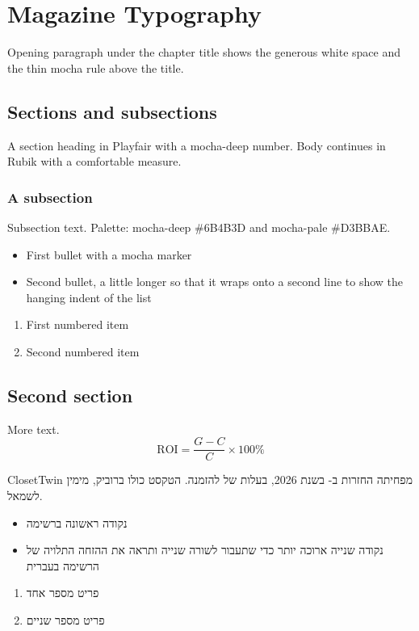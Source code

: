 \documentclass{closettwin}
\begin{document}
\mainmatter
\chapter{Magazine Typography}
Opening paragraph under the chapter title shows the generous white space and the thin mocha rule above the title.
\section{Sections and subsections}
A section heading in Playfair with a mocha-deep number. Body continues in Rubik with a comfortable measure.
\subsection{A subsection}
Subsection text. Palette: \textcolor{mochadeep}{mocha-deep \#6B4B3D} and \textcolor{mochapale}{mocha-pale \#D3BBAE}.
\begin{itemize}
\item First bullet with a mocha marker
\item Second bullet, a little longer so that it wraps onto a second line to show the hanging indent of the list
\end{itemize}
\begin{enumerate}
\item First numbered item
\item Second numbered item
\end{enumerate}
\section{Second section}
More text.
\begin{equation}
\mathrm{ROI}=\frac{G-C}{C}\times 100\%
\end{equation}
\begin{hebrewpage}
ClosetTwin מפחיתה החזרות ב- בשנת 2026, בעלות של  להזמנה. הטקסט כולו ברוביק, מימין לשמאל.
\begin{itemize}\item נקודה ראשונה ברשימה \item נקודה שנייה ארוכה יותר כדי שתעבור לשורה שנייה ותראה את ההזחה התלויה של הרשימה בעברית\end{itemize}
\begin{enumerate}\item פריט מספר אחד \item פריט מספר שניים\end{enumerate}
\end{hebrewpage}
\end{document}
